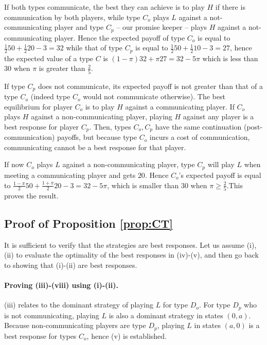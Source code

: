 \documentclass[12pt]{article}
\theoremstyle{break}
\begin{document}
	If both types communicate, the best they can achieve is to play $H$ if there is communication by both players, while type $C_o$ plays $L$ against a not-communicating player and type $C_p$ -- our promise keeper -- plays $H$ against a not-communicating player. Hence the expected payoff of type $C_o$ is equal to $\frac{1}{2}50+\frac{1}{2}20-3=32$ while that of type $C_p$ is equal to $\frac{1}{2}50+\frac{1}{2}10-3=27$, hence the expected value of a type $C$ is $(1-\pi)32+\pi 27=32-5\pi$ which is less than $30$ when $\pi$ is greater than $\frac{2}{5}$. 

	If type $C_p$ does not communicate, its expected payoff is not greater than that of a type $C_o$ (indeed type $C_o$ would not communicate otherwise). The best equilibrium for player $C_o$ is to play $H$ against a communicating player. If $C_o$ plays $H$ against a non-communicating player, playing $H$ against any player is a best response for player $C_p$. Then, types $C_o,C_p$ have the same continuation (post-communication) payoffs, but because type $C_o$ incurs a cost of communication, communicating cannot be a best response for that player. 
	
	If now $C_o$ plays $L$ against a non-communicating player, type $C_p$ will play $L$ when meeting a communicating player and gets $20$.  Hence $C_o$'s expected payoff is equal to $\frac{1-\pi}{2}50+\frac{1+\pi}{2}20-3=32-5\pi$, which is smaller than $30$ when $\pi\geq \frac{2}{5}$.This proves the result.


\subsection*{Proof of Proposition \ref{prop:CT}}

It is sufficient to verify that the strategies are best responses. Let us assume (i), (ii) to evaluate the optimality of the best responses in (iv)-(v), and then go back to showing that (i)-(ii) are best responses.

\paragraph{Proving (iii)-(viii) using (i)-(ii).} (iii) relates to the dominant strategy of playing $L$ for type $D_o$. For type $D_p$ who is not communicating, playing $L$ is also a dominant strategy in states $(0,a)$. Because non-communicating players are type $D_p$, playing $L$ in states $(a,0)$ is a best response for types $C_o$, hence (v) is established. 
\end{document}
